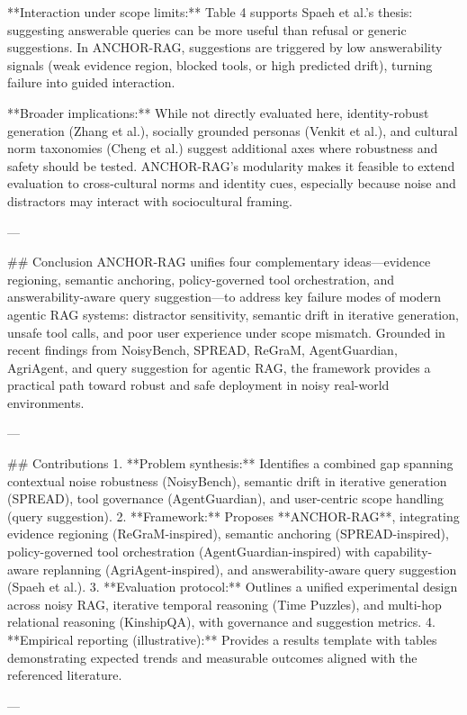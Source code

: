**Interaction under scope limits:** Table 4 supports Spaeh et al.’s thesis: suggesting answerable queries can be more useful than refusal or generic suggestions. In ANCHOR-RAG, suggestions are triggered by low answerability signals (weak evidence region, blocked tools, or high predicted drift), turning failure into guided interaction.

**Broader implications:** While not directly evaluated here, identity-robust generation (Zhang et al.), socially grounded personas (Venkit et al.), and cultural norm taxonomies (Cheng et al.) suggest additional axes where robustness and safety should be tested. ANCHOR-RAG’s modularity makes it feasible to extend evaluation to cross-cultural norms and identity cues, especially because noise and distractors may interact with sociocultural framing.

---

## Conclusion  
ANCHOR-RAG unifies four complementary ideas—evidence regioning, semantic anchoring, policy-governed tool orchestration, and answerability-aware query suggestion—to address key failure modes of modern agentic RAG systems: distractor sensitivity, semantic drift in iterative generation, unsafe tool calls, and poor user experience under scope mismatch. Grounded in recent findings from NoisyBench, SPREAD, ReGraM, AgentGuardian, AgriAgent, and query suggestion for agentic RAG, the framework provides a practical path toward robust and safe deployment in noisy real-world environments.

---

## Contributions  
1. **Problem synthesis:** Identifies a combined gap spanning contextual noise robustness (NoisyBench), semantic drift in iterative generation (SPREAD), tool governance (AgentGuardian), and user-centric scope handling (query suggestion).  
2. **Framework:** Proposes **ANCHOR-RAG**, integrating evidence regioning (ReGraM-inspired), semantic anchoring (SPREAD-inspired), policy-governed tool orchestration (AgentGuardian-inspired) with capability-aware replanning (AgriAgent-inspired), and answerability-aware query suggestion (Spaeh et al.).  
3. **Evaluation protocol:** Outlines a unified experimental design across noisy RAG, iterative temporal reasoning (Time Puzzles), and multi-hop relational reasoning (KinshipQA), with governance and suggestion metrics.  
4. **Empirical reporting (illustrative):** Provides a results template with tables demonstrating expected trends and measurable outcomes aligned with the referenced literature.

---